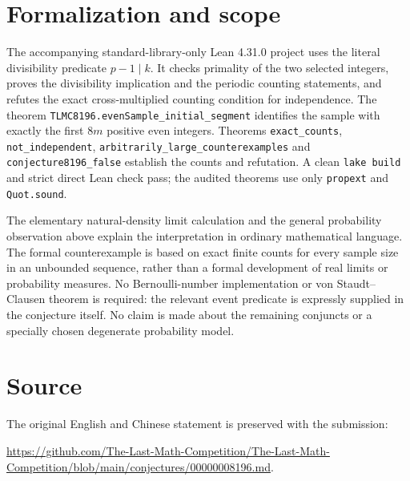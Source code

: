 \documentclass[10pt]{article}
\begin{document}
\section{Formalization and scope}
The accompanying standard-library-only Lean 4.31.0 project uses the literal divisibility predicate $p-1\mid k$. It checks primality of the two selected integers, proves the divisibility implication and the periodic counting statements, and refutes the exact cross-multiplied counting condition for independence. The theorem \texttt{TLMC8196.evenSample\_initial\_segment} identifies the sample with exactly the first $8m$ positive even integers. Theorems \texttt{exact\_counts}, \texttt{not\_independent}, \texttt{arbitrarily\_large\_counterexamples} and \texttt{conjecture8196\_false} establish the counts and refutation. A clean \texttt{lake build} and strict direct Lean check pass; the audited theorems use only \texttt{propext} and \texttt{Quot.sound}.

The elementary natural-density limit calculation and the general probability observation above explain the interpretation in ordinary mathematical language. The formal counterexample is based on exact finite counts for every sample size in an unbounded sequence, rather than a formal development of real limits or probability measures. No Bernoulli-number implementation or von Staudt--Clausen theorem is required: the relevant event predicate is expressly supplied in the conjecture itself. No claim is made about the remaining conjuncts or a specially chosen degenerate probability model.
\section{Source}
The original English and Chinese statement is preserved with the submission:
\begin{center}\url{https://github.com/The-Last-Math-Competition/The-Last-Math-Competition/blob/main/conjectures/00000008196.md}.\end{center}
\end{document}
